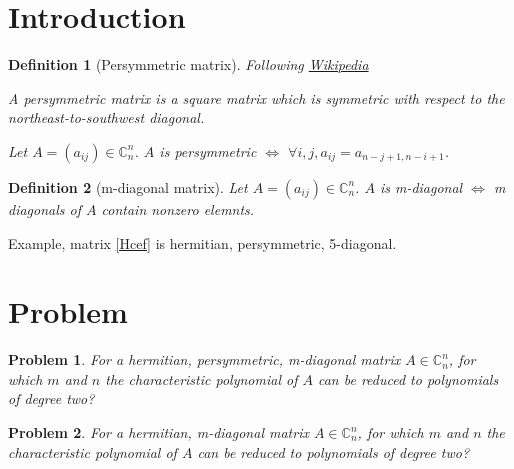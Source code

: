 \documentclass{article}
\newtheorem{definition}{Definition}
\newtheorem{problem}{Problem}
\begin{document}
\section{Introduction}
\begin{definition}[Persymmetric matrix]
Following \href{https://en.wikipedia.org/wiki/Persymmetric_matrix}{Wikipedia}

A persymmetric matrix is a square matrix which is symmetric with respect to the northeast-to-southwest diagonal.

Let $A=(a_{ij}) \in \mathbb{C}^n_n$. $A$ is persymmetric $\Leftrightarrow $  $\forall i,j, a_{ij} = a_{n-j+1, n-i+1}$.
\end{definition}

\begin{definition}[m-diagonal matrix]
Let $A=(a_{ij}) \in \mathbb{C}^n_n$. $A$ is m-diagonal $\Leftrightarrow$ m diagonals of $A$ contain nonzero elemnts.
\end{definition}
Example, matrix \ref{Hcef} is hermitian, persymmetric, 5-diagonal.



\section{Problem}

\begin{problem}
For a hermitian, persymmetric, m-diagonal matrix $A \in \mathbb{C}_n^n$, for which $m$ and $n$ the characteristic polynomial of $A$ can be reduced to polynomials of degree two?
\end{problem}

\begin{problem}
For a hermitian, m-diagonal matrix $A \in \mathbb{C}_n^n$, for which $m$ and $n$ the characteristic polynomial of $A$ can be reduced to polynomials of degree two?
\end{problem}
	
\end{document}
